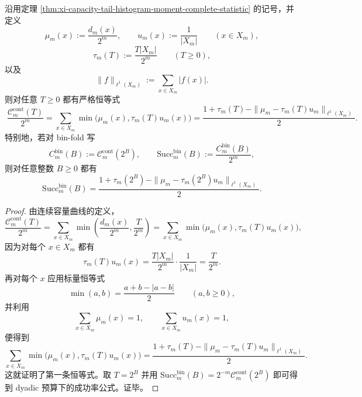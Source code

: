\begin{theorem}[连续容量曲线等于推前分布与均匀层测度的截断重叠泛函]\label{thm:xi-capacity-overlap-functional-l1-identity}
沿用定理 \ref{thm:xi-capacity-tail-histogram-moment-complete-statistic} 的记号，并定义
\[
\mu_m(x):=\frac{d_m(x)}{2^m},
\qquad
u_m(x):=\frac{1}{|X_m|}
\qquad (x\in X_m),
\]
\[
\tau_m(T):=\frac{T|X_m|}{2^m}
\qquad (T\ge 0),
\]
以及
\[
\|f\|_{\ell^1(X_m)}:=\sum_{x\in X_m}|f(x)|.
\]
则对任意 \(T\ge 0\) 都有严格恒等式
\[
\boxed{\;
\frac{\mathcal C_m^{\mathrm{cont}}(T)}{2^m}
=
\sum_{x\in X_m}\min\bigl(\mu_m(x),\tau_m(T)u_m(x)\bigr)
=
\frac{1+\tau_m(T)-\|\mu_m-\tau_m(T)u_m\|_{\ell^1(X_m)}}{2}.\;}
\]
特别地，若对 bin-fold 写
\[
C_m^{\mathrm{bin}}(B):=\mathcal C_m^{\mathrm{cont}}(2^B),
\qquad
\mathrm{Succ}_m^{\mathrm{bin}}(B):=\frac{C_m^{\mathrm{bin}}(B)}{2^m},
\]
则对任意整数 \(B\ge 0\) 都有
\[
\boxed{\;
\mathrm{Succ}_m^{\mathrm{bin}}(B)
=
\frac{1+\tau_m(2^B)-\|\mu_m-\tau_m(2^B)u_m\|_{\ell^1(X_m)}}{2}.\;}
\]
\end{theorem}
\begin{proof}
由连续容量曲线的定义，
\[
\frac{\mathcal C_m^{\mathrm{cont}}(T)}{2^m}
=
\sum_{x\in X_m}\min\!\left(\frac{d_m(x)}{2^m},\frac{T}{2^m}\right)
=
\sum_{x\in X_m}\min\bigl(\mu_m(x),\tau_m(T)u_m(x)\bigr),
\]
因为对每个 \(x\in X_m\) 都有
\[
\tau_m(T)u_m(x)=\frac{T|X_m|}{2^m}\cdot\frac{1}{|X_m|}=\frac{T}{2^m}.
\]
再对每个 \(x\) 应用标量恒等式
\[
\min(a,b)=\frac{a+b-|a-b|}{2}
\qquad(a,b\ge 0),
\]
并利用
\[
\sum_{x\in X_m}\mu_m(x)=1,
\qquad
\sum_{x\in X_m}u_m(x)=1,
\]
便得到
\[
\sum_{x\in X_m}\min\bigl(\mu_m(x),\tau_m(T)u_m(x)\bigr)
=
\frac{1+\tau_m(T)-\|\mu_m-\tau_m(T)u_m\|_{\ell^1(X_m)}}{2}.
\]
这就证明了第一条恒等式。取 \(T=2^B\) 并用
\(
\mathrm{Succ}_m^{\mathrm{bin}}(B)=2^{-m}\mathcal C_m^{\mathrm{cont}}(2^B)
\)
即可得到 dyadic 预算下的成功率公式。证毕。
\end{proof}

